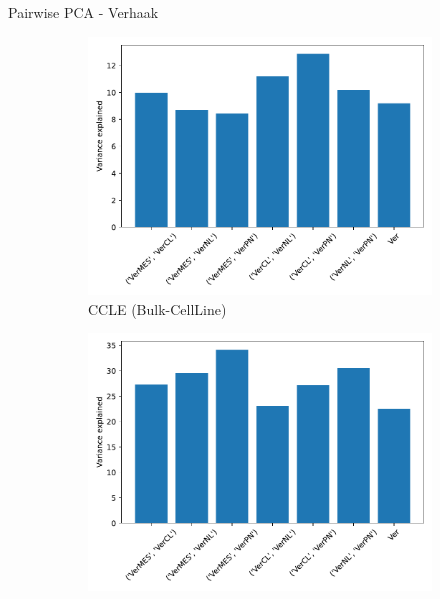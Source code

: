 \documentclass[aspectratio=169,9pt]{beamer}
\begin{document}
    \begin{frame}{Pairwise PCA - Verhaak}
        \begin{adjustwidth}{-5cm}{-5cm}
            \centering
            \begin{figure}\ContinuedFloat
                \centering
                \begin{subfigure}[c]{0.38\textwidth}
                    \centering
                    \includegraphics[width=\textwidth]{CCLE_expvar_Ver}
                    \caption{CCLE (Bulk-CellLine)}
                \end{subfigure}
                \begin{subfigure}[c]{0.38\textwidth}
                    \centering
                    \includegraphics[width=\textwidth]{TCGA_expvar_Ver}

\end{subfigure}
\end{figure}
\end{adjustwidth}
\end{frame}
\end{document}
